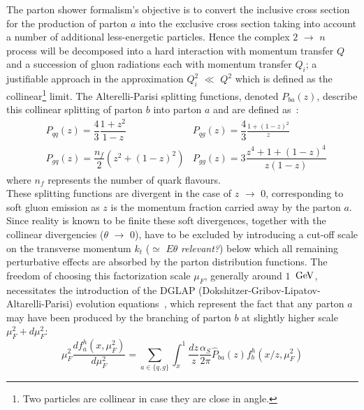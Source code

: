 The parton shower formalism's objective is to convert the inclusive cross section for the production of parton $a$ into the exclusive cross section taking into account a number of additional less-energetic particles.
Hence the complex $2$ $\rightarrow$ $n$ process will be decomposed into a hard interaction with momentum transfer $Q$ and a succession of gluon radiations each with momentum transfer $Q_{i}$; a justifiable approach in the approximation $Q_{i}^{2}$ $\ll$ $Q^2$ which is defined as the collinear\footnote{Two particles are collinear in case they are close in angle.} limit. 
The Alterelli-Parisi splitting functions, denoted $P_{ba}(z)$, describe this collinear splitting of parton $b$ into parton $a$ and are defined as~\cite{}:
\begin{eqnarray}
 & P_{qq}(z) = \dfrac{4}{3} \dfrac{1+z^{2}}{1-z}    & P_{qg}(z) = \dfrac{4}{3} \frac{1+(1-z)^{2}}{z} \\
 & P_{gq}(z) = \dfrac{n_{f}}{2} (z^{2} + (1-z)^{2}) & P_{gg}(z) = 3 \dfrac{z^{4}+1+(1-z)^{4}}{z(1-z)}
\end{eqnarray}
where $n_{f}$ represents the number of quark flavours.
\\
These splitting functions are divergent in the case of $z$ $\rightarrow$ $0$, corresponding to soft gluon emission as $z$ is the momentum fraction carried away by the parton $a$. 
Since reality is known to be finite these soft divergences, together with the collinear divergencies ($\theta$ $\rightarrow$ $0$), have to be excluded by introducing a cut-off scale on the transverse momentum $k_{t}$ ($\simeq$ $E\theta$ \textit{relevant?}) below which all remaining perturbative effects are absorbed by the parton distribution functions. 
The freedom of choosing this factorization scale $\mu_{F}$, generally around $1$ $\, \mathrm{GeV}$, necessitates the introduction of the DGLAP (Dokshitzer-Gribov-Lipatov-Altarelli-Parisi) evolution equations~\cite{}, which represent the fact that any parton $a$ may have been produced by the branching of parton $b$ at slightly higher scale $\mu_{F}^2 + d\mu_{F}^2$:\\
\begin{equation}\label{eq::PSProb_NoSudakov}
 \mu_{F}^2 \dfrac{d f_{a}^{h}(x,\mu_{F}^{2})}{d \mu_{F}^{2}} = \sum_{a \in \{q,g\} } \int_{x}^{1} \dfrac{dz}{z} \dfrac{\alpha_{S}}{2 \pi} \hat{P}_{ba}(z) f_{b}^{h}(x/z, \mu_{F}^{2})
\end{equation}

